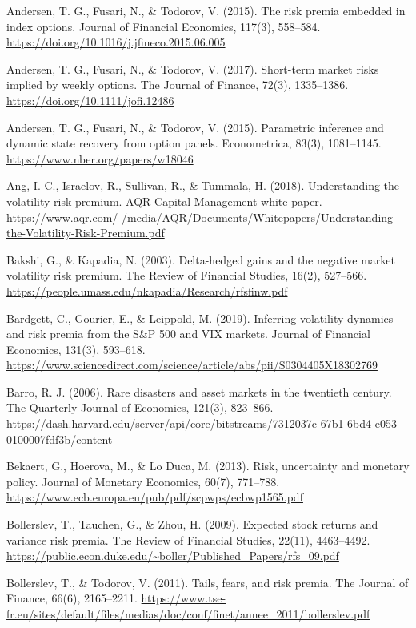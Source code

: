 \documentclass[11pt,a4paper]{article}
\begin{document}
\begin{fshfreferences}
\item Andersen, T. G., Fusari, N., \& Todorov, V. (2015). The risk premia embedded in index options. Journal of Financial Economics, 117(3), 558--584. \url{https://doi.org/10.1016/j.jfineco.2015.06.005}
\item Andersen, T. G., Fusari, N., \& Todorov, V. (2017). Short-term market risks implied by weekly options. The Journal of Finance, 72(3), 1335--1386. \url{https://doi.org/10.1111/jofi.12486}
\item Andersen, T. G., Fusari, N., \& Todorov, V. (2015). Parametric inference and dynamic state recovery from option panels. Econometrica, 83(3), 1081--1145. \url{https://www.nber.org/papers/w18046}
\item Ang, I.-C., Israelov, R., Sullivan, R., \& Tummala, H. (2018). Understanding the volatility risk premium. AQR Capital Management white paper. \url{https://www.aqr.com/-/media/AQR/Documents/Whitepapers/Understanding-the-Volatility-Risk-Premium.pdf}
\item Bakshi, G., \& Kapadia, N. (2003). Delta-hedged gains and the negative market volatility risk premium. The Review of Financial Studies, 16(2), 527--566. \url{https://people.umass.edu/nkapadia/Research/rfsfinw.pdf}
\item Bardgett, C., Gourier, E., \& Leippold, M. (2019). Inferring volatility dynamics and risk premia from the S\&P 500 and VIX markets. Journal of Financial Economics, 131(3), 593--618. \url{https://www.sciencedirect.com/science/article/abs/pii/S0304405X18302769}
\item Barro, R. J. (2006). Rare disasters and asset markets in the twentieth century. The Quarterly Journal of Economics, 121(3), 823--866. \url{https://dash.harvard.edu/server/api/core/bitstreams/7312037c-67b1-6bd4-e053-0100007fdf3b/content}
\item Bekaert, G., Hoerova, M., \& Lo Duca, M. (2013). Risk, uncertainty and monetary policy. Journal of Monetary Economics, 60(7), 771--788. \url{https://www.ecb.europa.eu/pub/pdf/scpwps/ecbwp1565.pdf}
\item Bollerslev, T., Tauchen, G., \& Zhou, H. (2009). Expected stock returns and variance risk premia. The Review of Financial Studies, 22(11), 4463--4492. \url{https://public.econ.duke.edu/~boller/Published_Papers/rfs_09.pdf}
\item Bollerslev, T., \& Todorov, V. (2011). Tails, fears, and risk premia. The Journal of Finance, 66(6), 2165--2211. \url{https://www.tse-fr.eu/sites/default/files/medias/doc/conf/finet/annee_2011/bollerslev.pdf}

\end{fshfreferences}
\end{document}
